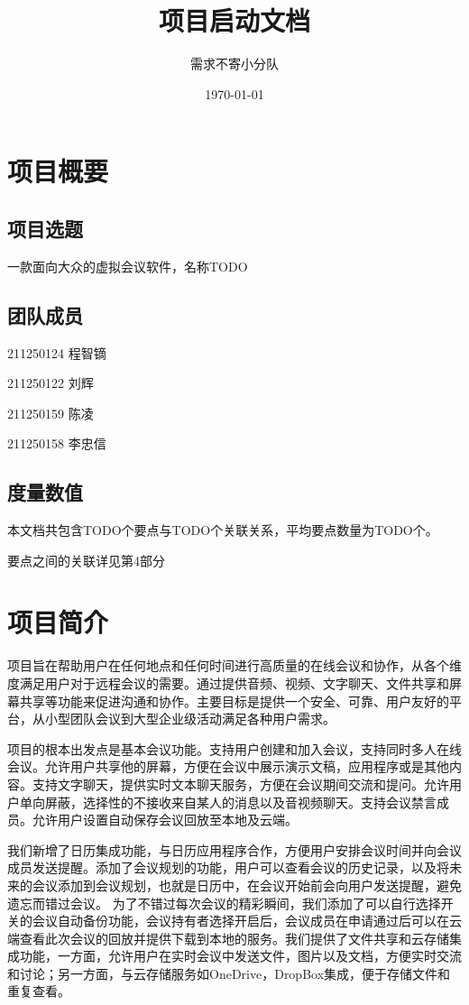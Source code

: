\documentclass[a4paper,12pt]{article}
\title{项目启动文档}
\author{需求不寄小分队}
\date{\today}
\begin{document}
    \maketitle

    \tableofcontents

    \section{项目概要}

    \subsection{项目选题}
    一款面向大众的虚拟会议软件，名称TODO
    \subsection{团队成员}
    211250124 程智镝

    211250122 刘辉

    211250159 陈凌

    211250158 李忠信
    \subsection{度量数值}
    本文档共包含TODO个要点与TODO个关联关系，平均要点数量为TODO个。

    要点之间的关联详见第4部分

    \section{项目简介}
    项目旨在帮助用户在任何地点和任何时间进行高质量的在线会议和协作，从各个维度满足用户对于远程会议的需要。通过提供音频、视频、文字聊天、文件共享和屏幕共享等功能来促进沟通和协作。主要目标是提供一个安全、可靠、用户友好的平台，从小型团队会议到大型企业级活动满足各种用户需求。

    项目的根本出发点是基本会议功能。支持用户创建和加入会议，支持同时多人在线会议。允许用户共享他的屏幕，方便在会议中展示演示文稿，应用程序或是其他内容。支持文字聊天，提供实时文本聊天服务，方便在会议期间交流和提问。允许用户单向屏蔽，选择性的不接收来自某人的消息以及音视频聊天。支持会议禁言成员。允许用户设置自动保存会议回放至本地及云端。

    我们新增了日历集成功能，与日历应用程序合作，方便用户安排会议时间并向会议成员发送提醒。添加了会议规划的功能，用户可以查看会议的历史记录，以及将未来的会议添加到会议规划，也就是日历中，在会议开始前会向用户发送提醒，避免遗忘而错过会议。
    为了不错过每次会议的精彩瞬间，我们添加了可以自行选择开关的会议自动备份功能，会议持有者选择开启后，会议成员在申请通过后可以在云端查看此次会议的回放并提供下载到本地的服务。我们提供了文件共享和云存储集成功能，一方面，允许用户在实时会议中发送文件，图片以及文档，方便实时交流和讨论；另一方面，与云存储服务如OneDrive，DropBox集成，便于存储文件和重复查看。
\end{document}

